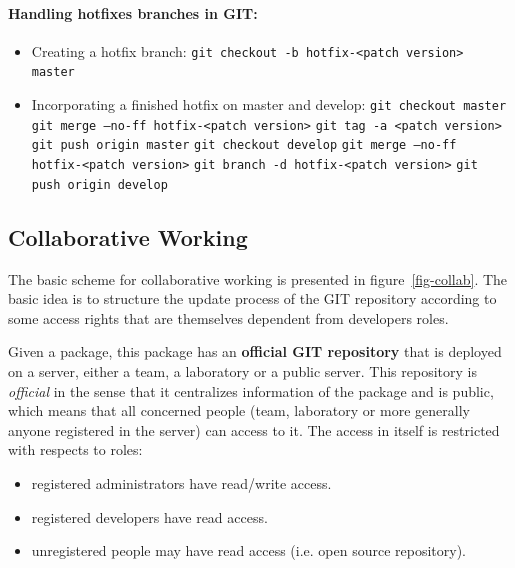 \documentclass[12pt,a4paper]{article}
\begin{document}
\pagebreak
\paragraph{Handling hotfixes branches in GIT:}
\begin{itemize}
\item Creating a hotfix branch:
\linebreak \texttt{git checkout -b hotfix-<patch version> master}
\item Incorporating a finished hotfix on master and develop:
\linebreak \texttt{git checkout master}
\linebreak \texttt{git merge --no-ff hotfix-<patch version>}
\linebreak \texttt{git tag -a <patch version>}
\linebreak \texttt{git push origin master}
\linebreak \texttt{git checkout develop}
\linebreak \texttt{git merge --no-ff hotfix-<patch version>}
\linebreak \texttt{git branch -d  hotfix-<patch version>}
\linebreak \texttt{git push origin develop}
\end{itemize}


\subsection{Collaborative Working}

The basic scheme for collaborative working is presented in figure~\ref{fig-collab}. The basic idea is to structure the update process of the GIT repository according to some access rights that are themselves dependent from developers roles.

Given a package, this package has an \textbf{official GIT repository} that is deployed on a server, either a team, a laboratory or a public server. This repository is \textit{official} in the sense that it centralizes information of the package and is public, which means that all concerned people (team, laboratory or more generally anyone registered in the server) can access to it. The access in itself is restricted with respects to roles:
\begin{itemize}
\item registered administrators have read/write access.
\item registered developers have read access.
\item unregistered people may have read access (i.e. open source repository).
\end{itemize}
\end{document}
